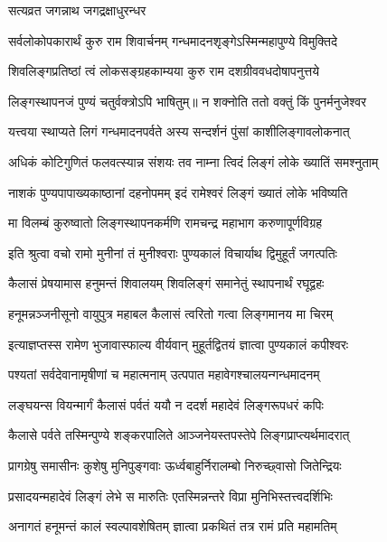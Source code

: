 \onelineshloka
{सत्यव्रत जगन्नाथ जगद्रक्षाधुरन्धर}%

\twolineshloka
{सर्वलोकोपकारार्थं कुरु राम शिवार्चनम्}
{गन्धमादनशृङ्गेऽस्मिन्महापुण्ये विमुक्तिदे}%

\twolineshloka
{शिवलिङ्गप्रतिष्ठां त्वं लोकसङ्ग्रहकाम्यया}
{कुरु राम दशग्रीववधदोषापनुत्तये}%


\twolineshloka
{लिङ्गस्थापनजं पुण्यं चतुर्वक्त्रोऽपि भाषितुम्॥}
{न शक्नोति ततो वक्तुं किं पुनर्मनुजेश्वर}%

\twolineshloka
{यत्त्वया स्थाप्यते लिगं गन्धमादनपर्वते}
{अस्य सन्दर्शनं पुंसां काशीलिङ्गावलोकनात्}%

\twolineshloka
{अधिकं कोटिगुणितं फलवत्स्यान्न संशयः}
{तव नाम्ना त्विदं लिङ्गं लोके ख्यातिं समश्नुताम्}%

\twolineshloka
{नाशकं पुण्यपापाख्यकाष्ठानां दहनोपमम्}
{इदं रामेश्वरं लिङ्गं ख्यातं लोके भविष्यति}%

\twolineshloka
{मा विलम्बं कुरुष्वातो लिङ्गस्थापनकर्मणि}
{रामचन्द्र महाभाग करुणापूर्णविग्रह}%


\twolineshloka
{इति श्रुत्वा वचो रामो मुनीनां तं मुनीश्वराः}
{पुण्यकालं विचार्याथ द्विमुहूर्तं जगत्पतिः}%

\twolineshloka
{कैलासं प्रेषयामास हनुमन्तं शिवालयम्}
{शिवलिङ्गं समानेतुं स्थापनार्थं रघूद्वहः}%


\twolineshloka
{हनूमन्नञ्जनीसूनो वायुपुत्र महाबल}
{कैलासं त्वरितो गत्वा लिङ्गमानय मा चिरम्}%

\twolineshloka
{इत्याज्ञप्तस्स रामेण भुजावास्फाल्य वीर्यवान्}
{मुहूर्तद्वितयं ज्ञात्वा पुण्यकालं कपीश्वरः}%

\twolineshloka
{पश्यतां सर्वदेवानामृषीणां च महात्मनाम्}
{उत्पपात महावेगश्चालयन्गन्धमादनम्}%

\twolineshloka
{लङ्घयन्स वियन्मार्गं कैलासं पर्वतं ययौ}
{न ददर्श महादेवं लिङ्गरूपधरं कपिः}%

\twolineshloka
{कैलासे पर्वते तस्मिन्पुण्ये शङ्करपालिते}
{आञ्जनेयस्तपस्तेपे लिङ्गप्राप्त्यर्थमादरात्}%

\twolineshloka
{प्रागग्रेषु समासीनः कुशेषु मुनिपुङ्गवाः}
{ऊर्ध्वबाहुर्निरालम्बो निरुच्छ्वासो जितेन्द्रियः}%

\twolineshloka
{प्रसादयन्महादेवं लिङ्गं लेभे स मारुतिः}
{एतस्मिन्नन्तरे विप्रा मुनिभिस्तत्त्वदर्शिभिः}%

\twolineshloka
{अनागतं हनूमन्तं कालं स्वल्पावशेषितम्}
{ज्ञात्वा प्रकथितं तत्र रामं प्रति महामतिम्}%

